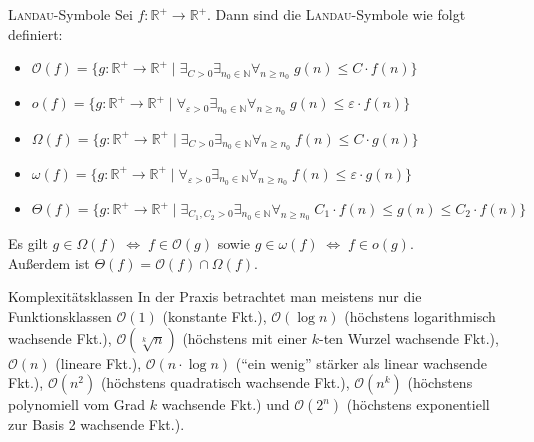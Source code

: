 \begin{Def}{\textsc{Landau}-Symbole}
    Sei $f: \mathbb{R}^+ \rightarrow \mathbb{R}^+$.
    Dann sind die \textsc{Landau}-Symbole wie folgt definiert:
    \begin{itemize}
        \item $\mathcal{O}(f) =
        \{g: \mathbb{R}^+ \rightarrow \mathbb{R}^+ \;|\;
        \exists_{C > 0} \exists_{n_0 \in \mathbb{N}}
        \forall_{n \ge n_0}\; g(n) \le C \cdot f(n)\}$
        
        \item $o(f) =
        \{g: \mathbb{R}^+ \rightarrow \mathbb{R}^+ \;|\;
        \forall_{\varepsilon > 0} \exists_{n_0 \in \mathbb{N}}
        \forall_{n \ge n_0}\; g(n) \le \varepsilon \cdot f(n)\}$
        
        \item $\Omega(f) =
        \{g: \mathbb{R}^+ \rightarrow \mathbb{R}^+ \;|\;
        \exists_{C > 0} \exists_{n_0 \in \mathbb{N}}
        \forall_{n \ge n_0}\; f(n) \le C \cdot g(n)\}$
        
        \item $\omega(f) =
        \{g: \mathbb{R}^+ \rightarrow \mathbb{R}^+ \;|\;
        \forall_{\varepsilon > 0} \exists_{n_0 \in \mathbb{N}}
        \forall_{n \ge n_0}\; f(n) \le \varepsilon \cdot g(n)\}$
        
        \item $\Theta(f) =
        \{g: \mathbb{R}^+ \rightarrow \mathbb{R}^+ \;|\;
        \exists_{C_1, C_2 > 0} \exists_{n_0 \in \mathbb{N}}
        \forall_{n \ge n_0}\; C_1 \cdot f(n) \le g(n) \le C_2 \cdot f(n)\}$
    \end{itemize}
    Es gilt $g \in \Omega(f) \;\Leftrightarrow\; f \in \mathcal{O}(g)$
    sowie $g \in \omega(f) \;\Leftrightarrow\; f \in o(g)$. \\
    Außerdem ist $\Theta(f) = \mathcal{O}(f) \cap \Omega(f)$.
\end{Def}

\begin{Def}{Komplexitätsklassen}
    In der Praxis betrachtet man meistens nur die Funktionsklassen
    $\mathcal{O}(1)$ (konstante Fkt.),
    $\mathcal{O}(\log n)$ (höchstens logarithmisch wachsende Fkt.),
    $\mathcal{O}(\sqrt[k]{n})$ (höchstens mit einer $k$-ten Wurzel wachsende
    Fkt.),
    $\mathcal{O}(n)$ (lineare Fkt.),
    $\mathcal{O}(n \cdot \log n)$ ("`ein wenig"' stärker als linear wachsende
    Fkt.),
    $\mathcal{O}(n^2)$ (höchstens quadratisch wachsende Fkt.),
    $\mathcal{O}(n^k)$ (höchstens polynomiell vom Grad $k$ wachsende Fkt.) und
    $\mathcal{O}(2^n)$ (höchstens exponentiell zur Basis 2 wachsende Fkt.).
\end{Def}

